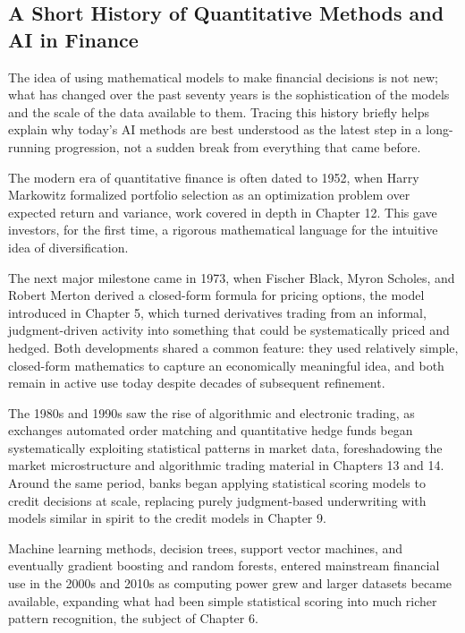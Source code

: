 \documentclass[../ai_in_finance]{subfiles}
\begin{document}
\subsection{A Short History of Quantitative Methods and AI in Finance}

The idea of using mathematical models to make financial decisions is not new; what has changed over the past seventy years is the sophistication of the models and the scale of the data available to them. Tracing this history briefly helps explain why today's AI methods are best understood as the latest step in a long-running progression, not a sudden break from everything that came before.

The modern era of quantitative finance is often dated to 1952, when Harry Markowitz formalized portfolio selection as an optimization problem over expected return and variance, work covered in depth in Chapter 12. This gave investors, for the first time, a rigorous mathematical language for the intuitive idea of diversification.

The next major milestone came in 1973, when Fischer Black, Myron Scholes, and Robert Merton derived a closed-form formula for pricing options, the model introduced in Chapter 5, which turned derivatives trading from an informal, judgment-driven activity into something that could be systematically priced and hedged. Both developments shared a common feature: they used relatively simple, closed-form mathematics to capture an economically meaningful idea, and both remain in active use today despite decades of subsequent refinement.

The 1980s and 1990s saw the rise of algorithmic and electronic trading, as exchanges automated order matching and quantitative hedge funds began systematically exploiting statistical patterns in market data, foreshadowing the market microstructure and algorithmic trading material in Chapters 13 and 14. Around the same period, banks began applying statistical scoring models to credit decisions at scale, replacing purely judgment-based underwriting with models similar in spirit to the credit models in Chapter 9.

Machine learning methods, decision trees, support vector machines, and eventually gradient boosting and random forests, entered mainstream financial use in the 2000s and 2010s as computing power grew and larger datasets became available, expanding what had been simple statistical scoring into much richer pattern recognition, the subject of Chapter 6.
\end{document}
